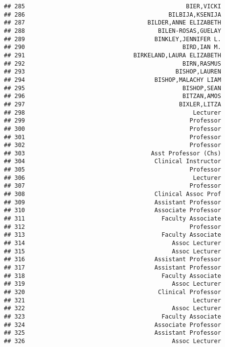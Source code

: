 \documentclass[
]{article}
\begin{document}
\begin{verbatim}
## 285                                              BIER,VICKI
## 286                                         BILBIJA,KSENIJA
## 287                                   BILDER,ANNE ELIZABETH
## 288                                      BILEN-ROSAS,GUELAY
## 289                                     BINKLEY,JENNIFER L.
## 290                                             BIRD,IAN M.
## 291                               BIRKELAND,LAURA ELIZABETH
## 292                                             BIRN,RASMUS
## 293                                           BISHOP,LAUREN
## 294                                     BISHOP,MALACHY LIAM
## 295                                             BISHOP,SEAN
## 296                                             BITZAN,AMOS
## 297                                            BIXLER,LITZA
## 298                                                Lecturer
## 299                                               Professor
## 300                                               Professor
## 301                                               Professor
## 302                                               Professor
## 303                                    Asst Professor (Chs)
## 304                                     Clinical Instructor
## 305                                               Professor
## 306                                                Lecturer
## 307                                               Professor
## 308                                     Clinical Assoc Prof
## 309                                     Assistant Professor
## 310                                     Associate Professor
## 311                                       Faculty Associate
## 312                                               Professor
## 313                                       Faculty Associate
## 314                                          Assoc Lecturer
## 315                                          Assoc Lecturer
## 316                                     Assistant Professor
## 317                                     Assistant Professor
## 318                                       Faculty Associate
## 319                                          Assoc Lecturer
## 320                                      Clinical Professor
## 321                                                Lecturer
## 322                                          Assoc Lecturer
## 323                                       Faculty Associate
## 324                                     Associate Professor
## 325                                     Assistant Professor
## 326                                          Assoc Lecturer

\end{verbatim}
\end{document}
